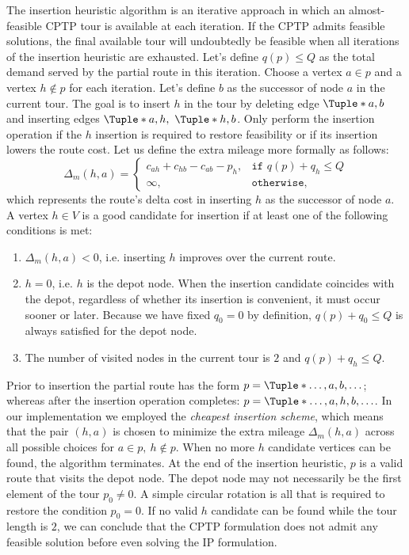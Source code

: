 The insertion heuristic algorithm is an iterative approach
in which an almost-feasible CPTP tour is available at each iteration.
If the CPTP admits feasible solutions,
the final available tour will undoubtedly be feasible
when all iterations of the insertion heuristic are exhausted.
Let's define $q(p) \le Q$ as the total demand served
by the partial route in this iteration.
Choose a vertex $a \in p$ and a vertex $h \notin p$ for each iteration.
Let's define $b$ as the successor of node $a$ in the current tour.
The goal is to insert $h$ in the tour
by deleting edge $\Tuple*{a, b}$
and inserting edges $\Tuple*{a, h},\ \Tuple*{h, b}$.
Only perform the insertion operation if the $h$ insertion
is required to restore feasibility or if its insertion lowers the route cost.
Let us define the extra mileage more formally as follows:
\begin{equation}
	\Delta_m(h, a) =
	\begin{cases}
		c_{ah} + c_{hb} - c_{ab} - p_h, & \texttt{if } q(p) + q_h \le Q \\
		\infty,                         & \texttt{otherwise},
	\end{cases}
\end{equation}
which represents the route's delta cost in inserting $h$ as the successor of node $a$.
A vertex $h \in V$ is a good candidate for insertion
if at least one of the following conditions is met:
\begin{enumerate}
	\item $\Delta_m(h, a) < 0$, i.e. inserting $h$ improves over the current route.
	\item $h = 0$, i.e. $h$ is the depot node.
	      When the insertion candidate coincides with the depot,
	      regardless of whether its insertion is convenient, it must occur sooner or later.
	      Because we have fixed $q_0 = 0$ by definition,
	      $q(p) + q_0 \le Q$ is always satisfied for the depot node.
	\item The number of visited nodes in the current tour is $2$ and $q(p) + q_h \le Q$.
\end{enumerate}

Prior to insertion the partial route has the form $p = \Tuple*{\dots, a, b, \dots}$;
whereas after the insertion operation completes: $p = \Tuple*{\dots, a, h, b, \dots}$.
In our implementation we employed the \textit{cheapest insertion scheme},
which means that the pair $(h, a)$ is chosen to minimize the extra mileage $\Delta_m(h, a)$
across all possible choices for $a \in p,\ h \notin p$.
When no more $h$ candidate vertices can be found, the algorithm terminates.
At the end of the insertion heuristic, $p$ is a valid route that visits the depot node.
The depot node may not necessarily be the first element of the tour $p_0 \ne 0$.
A simple circular rotation is all that is required to restore the condition $p_0 = 0$.
If no valid $h$ candidate can be found while the tour length is $2$,
we can conclude that the CPTP formulation does not admit any feasible solution
before even solving the IP formulation.

